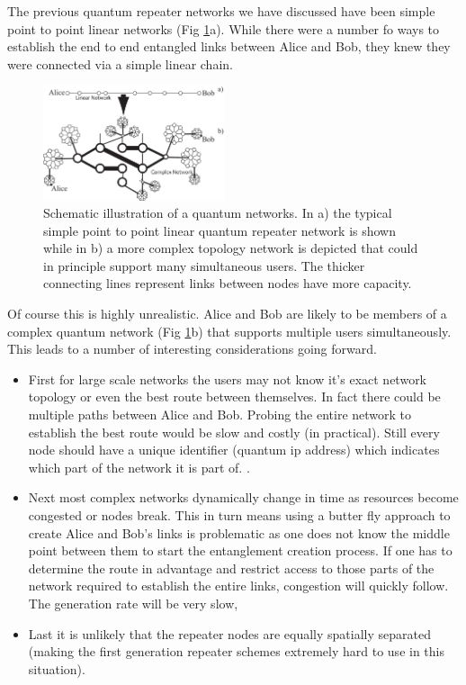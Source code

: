 \documentclass[twocolumn, aps, rmp, amsmath, amssymb, nofootinbib, superscriptaddress, longbibliography, floatfix, table-of-contents, eqsecnum]{revtex4-1}
\newcommand{\comment}[1]{{\color{blue}{\textbf{#1}}}}
\begin{document}
The previous quantum repeater networks we have discussed have been simple point to point linear networks (Fig \ref{fig10}a). While there were a number fo ways to establish the end to end entangled links between Alice and Bob, they knew they were connected via a simple linear chain. 
\begin{figure}[!htb]
\includegraphics[width=0.475\textwidth]{repeaters_10}
\caption{\comment{Redo fig}Schematic illustration of a quantum networks. In a) the typical simple point to point linear quantum repeater network is shown while in b) a more complex topology network  is depicted that could in principle support many simultaneous users. The thicker connecting lines represent links between nodes have more capacity.}
\label{fig10}
\end{figure} 
Of course this is highly unrealistic. Alice and Bob are likely to be members of a complex quantum network (Fig \ref{fig10}b) that supports multiple users  simultaneously. This leads to a number of interesting considerations going forward. 
\begin{itemize}
\item First for large scale networks the users may not know it's exact network topology or even the best route between themselves. In fact there could be multiple paths between Alice and Bob. Probing the entire network to establish the best route would be slow and costly (in practical). Still every node should have a unique identifier (quantum ip address) which indicates which part of the network it is part of. .
\item Next most complex networks dynamically change in time as resources become congested or nodes break. This in turn means using a butter fly approach to create Alice and Bob's links is problematic as one does not know the middle point between them to start the entanglement creation process. If one has to determine the route in advantage and restrict access to those parts of the network required to establish the entire links, congestion will quickly follow. The generation rate will be very slow, 
\item Last it is unlikely that the repeater nodes are equally spatially separated (making the first generation repeater schemes extremely hard to use in this situation). 
\end{itemize}
\end{document}
